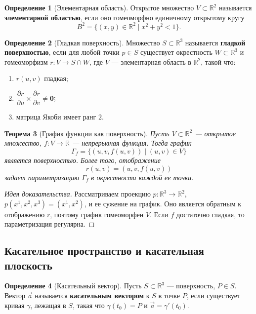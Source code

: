 \documentclass[12pt,a4paper]{article}
\newtheorem{theorem}{Теорема}[section]
\theoremstyle{definition}
\newtheorem{definition}[theorem]{Определение}
\begin{document}
\begin{definition}[Элементарная область]
Открытое множество $V \subset \mathbb{R}^2$ называется \textbf{элементарной областью}, если оно гомеоморфно единичному открытому кругу
$$B^2 = \{(x,y) \in \mathbb{R}^2 \mid x^2 + y^2 < 1\}.$$
\end{definition}

\begin{definition}[Гладкая поверхность]
Множество $S \subset \mathbb{R}^3$ называется \textbf{гладкой поверхностью}, если для любой точки $p \in S$ существует окрестность $W \subset \mathbb{R}^3$ и гомеоморфизм $r: V \to S \cap W$, где $V$ --- элементарная область в $\mathbb{R}^2$, такой что:
\begin{enumerate}
    \item $r(u, v)$ гладкая;
    \item $\dfrac{\partial r}{\partial u} \times \dfrac{\partial r}{\partial v} \neq \mathbf{0}$;
    \item матрица Якоби имеет ранг $2$.
\end{enumerate}
\end{definition}

\begin{theorem}[График функции как поверхность]
Пусть $V \subset \mathbb{R}^2$ --- открытое множество, $f: V \to \mathbb{R}$ --- непрерывная функция. Тогда график
$$\Gamma_f = \{(u, v, f(u,v)) \mid (u,v) \in V\}$$
является поверхностью. Более того, отображение
$$r(u,v) = (u, v, f(u,v))$$
задает параметризацию $\Gamma_f$ в окрестности каждой ее точки.
\end{theorem}

\begin{proof}[Идея доказательства]
Рассматриваем проекцию $p: \mathbb{R}^3 \to \mathbb{R}^2$, $p(x^1, x^2, x^3) = (x^1, x^2)$, и ее сужение на график. Оно является обратным к отображению $r$, поэтому график гомеоморфен $V$. Если $f$ достаточно гладкая, то параметризация регулярна.
\end{proof}

\subsection{Касательное пространство и касательная плоскость}

\begin{definition}[Касательный вектор]
Пусть $S \subset \mathbb{R}^3$ --- поверхность, $P \in S$. Вектор $\vec{a}$ называется \textbf{касательным вектором} к $S$ в точке $P$, если существует кривая $\gamma$, лежащая в $S$, такая что $\gamma(t_0) = P$ и $\vec{a} = \gamma'(t_0)$.
\end{definition}
\end{document}
